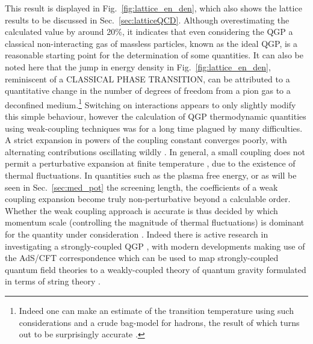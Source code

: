 \documentclass[11pt, a4paper, twoside]{book}
\begin{document}
This result is displayed in Fig.~\ref{fig:lattice_en_den}, which also shows the lattice results to be discussed in Sec.~\ref{sec:latticeQCD}. Although overestimating the calculated value by around 20\%, it indicates that even considering the QGP a classical non-interacting gas of massless particles, known as the ideal QGP, is a reasonable starting point for the determination of some quantities. It can also be noted here that the jump in energy density in Fig.~\ref{fig:lattice_en_den}, reminiscent of a CLASSICAL PHASE TRANSITION, can be attributed to a quantitative change in the number of degrees of freedom from a pion gas to a deconfined medium.\footnote{Indeed one can make an estimate of the transition temperature using such considerations and a crude bag-model for hadrons, the result of which turns out to be surprisingly accurate \cite{2001ConPh..42..209H}.} Switching on interactions appears to only slightly modify this simple behaviour, however the calculation of QGP thermodynamic quantities using weak-coupling techniques was for a long time plagued by many difficulties. A strict expansion in powers of the coupling constant converges poorly, with alternating contributions oscillating wildly \cite{Blaizot:2003tw}. In general, a small coupling does not permit a perturbative expansion at finite temperature \cite{Arnold:2007pg}, due to the existence of thermal fluctuations. In quantities such as the plasma free energy, or as will be seen in Sec.~\ref{sec:med_pot} the screening length, the coefficients of a weak coupling expansion become truly non-perturbative beyond a calculable order. Whether the weak coupling approach is accurate is thus decided by which momentum scale (controlling the magnitude of thermal fluctuations) is dominant for the quantity under consideration \cite{Blaizot:2003tw}. Indeed there is active research in investigating a strongly-coupled QGP \cite{Gyulassy:2004zy}, with modern developments making use of the AdS/CFT correspondence which can be used to map strongly-coupled quantum field theories to a weakly-coupled theory of quantum gravity formulated in terms of string theory \cite{CasalderreySolana:2011us}.
\end{document}
